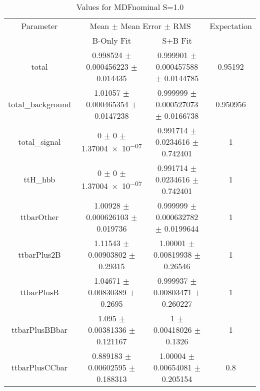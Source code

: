 \begin{table}
\centering
\caption{Values for MDFnominal S=1.0}
\begin{tabular}{cccc}
\toprule
Parameter & \multicolumn{2}{c}{Mean $\pm$ Mean Error $\pm$ RMS} & Expectation\\
 & B-Only Fit & S+B Fit & \\
\midrule
total & \num{0.998524} $\pm$ \num{0.000456223} $\pm$ \num{0.014435} & \num{0.999901} $\pm$ \num{0.000457588} $\pm$ \num{0.0144785} & \num{0.95192}\\
total\_background & \num{1.01057} $\pm$ \num{0.000465354} $\pm$ \num{0.0147238} & \num{0.999999} $\pm$ \num{0.000527073} $\pm$ \num{0.0166738} & \num{0.950956}\\
total\_signal & \num{0} $\pm$ \num{0} $\pm$ \num{1.37004e-07} & \num{0.991714} $\pm$ \num{0.0234616} $\pm$ \num{0.742401} & \num{1}\\
ttH\_hbb & \num{0} $\pm$ \num{0} $\pm$ \num{1.37004e-07} & \num{0.991714} $\pm$ \num{0.0234616} $\pm$ \num{0.742401} & \num{1}\\
ttbarOther & \num{1.00928} $\pm$ \num{0.000626103} $\pm$ \num{0.019736} & \num{0.999999} $\pm$ \num{0.000632782} $\pm$ \num{0.0199644} & \num{1}\\
ttbarPlus2B & \num{1.11543} $\pm$ \num{0.00903802} $\pm$ \num{0.29315} & \num{1.00001} $\pm$ \num{0.00819938} $\pm$ \num{0.26546} & \num{1}\\
ttbarPlusB & \num{1.04671} $\pm$ \num{0.00830389} $\pm$ \num{0.2695} & \num{0.999937} $\pm$ \num{0.00803471} $\pm$ \num{0.260227} & \num{1}\\
ttbarPlusBBbar & \num{1.095} $\pm$ \num{0.00381336} $\pm$ \num{0.121167} & \num{1} $\pm$ \num{0.00418026} $\pm$ \num{0.1326} & \num{1}\\
ttbarPlusCCbar & \num{0.889183} $\pm$ \num{0.00602595} $\pm$ \num{0.188313} & \num{1.00004} $\pm$ \num{0.00654081} $\pm$ \num{0.205154} & \num{0.8}\\
\bottomrule
\end{tabular}
\end{table}